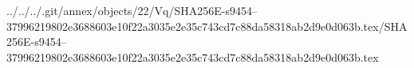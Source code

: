 ../../../.git/annex/objects/22/Vq/SHA256E-s9454--37996219802e3688603e10f22a3035e2e35c743cd7c88da58318ab2d9e0d063b.tex/SHA256E-s9454--37996219802e3688603e10f22a3035e2e35c743cd7c88da58318ab2d9e0d063b.tex